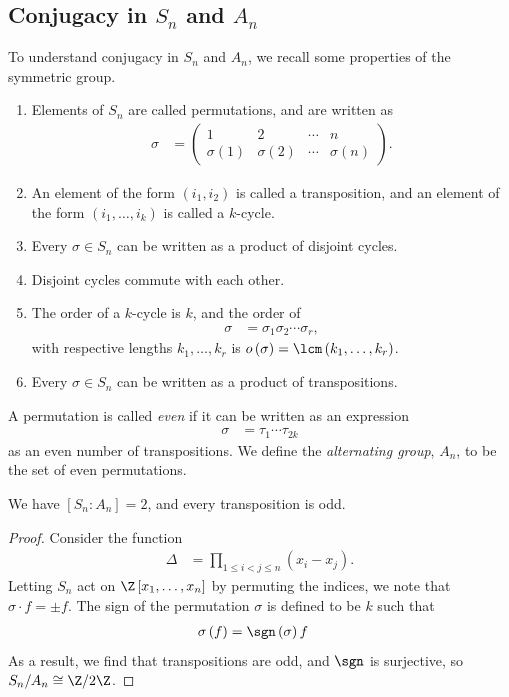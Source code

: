 \documentclass[10pt]{mypackage}
\begin{document}
\subsection{Conjugacy in $S_n$ and $A_n$}%
To understand conjugacy in $S_n$ and $A_n$, we recall some properties of the symmetric group.
\begin{enumerate}[(1)]
  \item Elements of $S_n$ are called permutations, and are written as
    \begin{align*}
      \sigma &= \begin{pmatrix}1 & 2 & \cdots & n \\ \sigma(1) & \sigma(2) & \cdots & \sigma(n)\end{pmatrix}.
    \end{align*}
  \item An element of the form $\left( i_1,i_2 \right)$ is called a transposition, and an element of the form $\left( i_1,\dots,i_k \right)$ is called a $k$-cycle.
  \item Every $\sigma\in S_n$ can be written as a product of disjoint cycles.
  \item Disjoint cycles commute with each other.
  \item The order of a $k$-cycle is $k$, and the order of
    \begin{align*}
      \sigma &= \sigma_1\sigma_2\cdots\sigma_r,
    \end{align*}
    with respective lengths $k_1,\dots,k_r$ is $o\left( \sigma \right) = \lcm\left( k_1,\dots,k_r \right)$.
  \item Every $\sigma\in S_n$ can be written as a product of transpositions.
\end{enumerate}
\begin{definition}
  A permutation is called \textit{even} if it can be written as an expression
  \begin{align*}
    \sigma &= \tau_1\cdots \tau_{2k}
  \end{align*}
  as an even number of transpositions. We define the \textit{alternating group}, $A_n$, to be the set of even permutations.
\end{definition}
\begin{theorem}
  We have $\left[ S_n:A_n \right] = 2$, and every transposition is odd.
\end{theorem}
\begin{proof}
  Consider the function
  \begin{align*}
    \Delta &= \prod_{1\leq i < j \leq n} \left( x_i-x_j \right).
  \end{align*}
  Letting $S_n$ act on $\Z\left[ x_1,\dots,x_n \right]$ by permuting the indices, we note that $\sigma\cdot f = \pm f$. The sign of the permutation $\sigma$ is defined to be $k$ such that
  \begin{align*}
    \sigma\left( f \right) &= \sgn\left( \sigma \right) f
  \end{align*}
  As a result, we find that transpositions are odd, and $\sgn$ is surjective, so $S_n/A_n\cong \Z/2\Z$.
\end{proof}
\end{document}
